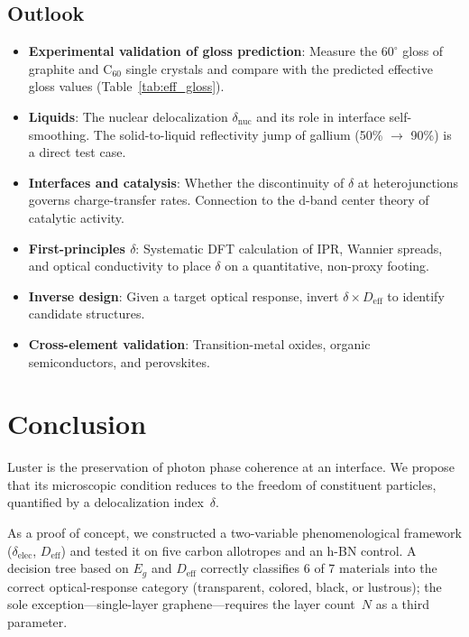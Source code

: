 \documentclass[twocolumn,showpacs,preprintnumbers,amsmath,amssymb,prb]{revtex4-2}
\begin{document}
\subsection{Outlook}

\begin{itemize}
  \item \textbf{Experimental validation of gloss prediction}: Measure
    the $60^\circ$ gloss of graphite and C$_{60}$ single crystals
    and compare with the predicted effective gloss values
    (Table~\ref{tab:eff_gloss}).
  \item \textbf{Liquids}: The nuclear delocalization
    $\delta_\mathrm{nuc}$ and its role in interface self-smoothing.
    The solid-to-liquid reflectivity jump of gallium (50\% $\to$ 90\%)
    is a direct test case.
  \item \textbf{Interfaces and catalysis}: Whether the discontinuity
    of $\delta$ at heterojunctions governs charge-transfer rates.
    Connection to the d-band center theory of catalytic activity.
  \item \textbf{First-principles $\delta$}: Systematic DFT calculation
    of IPR, Wannier spreads, and optical conductivity to place $\delta$
    on a quantitative, non-proxy footing.
  \item \textbf{Inverse design}: Given a target optical response,
    invert $\delta \times D_\mathrm{eff}$ to identify candidate
    structures.
  \item \textbf{Cross-element validation}: Transition-metal oxides,
    organic semiconductors, and perovskites.
\end{itemize}

\section{Conclusion}
\label{sec:conclusion}

Luster is the preservation of photon phase coherence at an interface.
We propose that its microscopic condition reduces to the freedom of
constituent particles, quantified by a delocalization index~$\delta$.

As a proof of concept, we constructed a two-variable phenomenological
framework ($\delta_\mathrm{elec}$, $D_\mathrm{eff}$) and tested it on
five carbon allotropes and an h-BN control. A decision tree based on
$E_g$ and $D_\mathrm{eff}$ correctly classifies 6 of 7 materials
into the correct optical-response category (transparent, colored,
black, or lustrous); the sole exception---single-layer graphene---requires
the layer count~$N$ as a third parameter.
\end{document}
